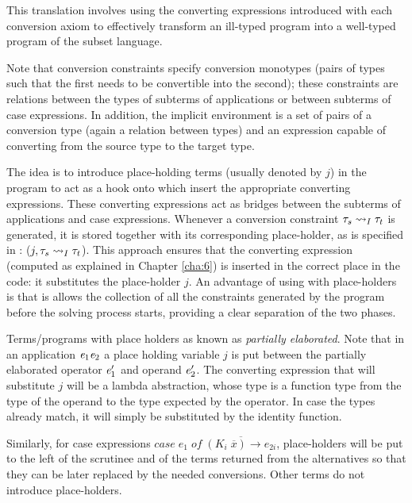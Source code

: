 
This translation involves using the converting expressions introduced with each conversion axiom to effectively transform an ill-typed program into a well-typed program of the subset language.

Note that conversion constraints specify conversion monotypes (pairs of types such that the first needs to be convertible into the second); these constraints are relations between the types of subterms of applications or between subterms of case expressions. In addition, the implicit environment is a set of pairs of a conversion type (again a relation between types) and an expression capable of converting from the source type to the target type.

The idea is to introduce place-holding terms (usually denoted by $j$) in the program to act as a hook onto which insert the appropriate converting expressions. These converting expressions act as bridges between the subterms of applications and case expressions. Whenever a conversion constraint ${\mathit{\tau}_s} \rightsquigarrow_{I} {\mathit{\tau}_t}$ is generated, it is stored together with its corresponding place-holder, as is specified in : ($j,{\mathit{\tau}_s} \rightsquigarrow_{I} {\mathit{\tau}_t}$). This approach ensures that the converting expression (computed as explained in Chapter \ref{cha:6}) is inserted in the correct place in the code: it substitutes the place-holder $j$. An advantage of using  with place-holders is that is allows the collection of all the constraints generated by the program before the solving process starts, providing a clear separation of the two phases.


Terms/programs with place holders as known as \textit{partially elaborated}. Note that in an application $\mathit{e}_1 \mathit{e}_2$ a place holding variable $j$ is put between the partially elaborated operator $\mathit{e}_1'$ and operand $\mathit{e}_2'$. The converting expression that will substitute $j$ will be a lambda abstraction, whose type is a function type from the type of the operand to the type expected by the operator. In case the types already match, it will simply be substituted by the identity function.

Similarly, for case expressions $case\;e_1\;of\;\overline{(K_i\;\overline{x})\rightarrow e_{2i}}$, place-holders will be put to the left of the scrutinee and of the terms returned from the alternatives so that they can be later replaced by the needed conversions. Other terms do not introduce place-holders.

